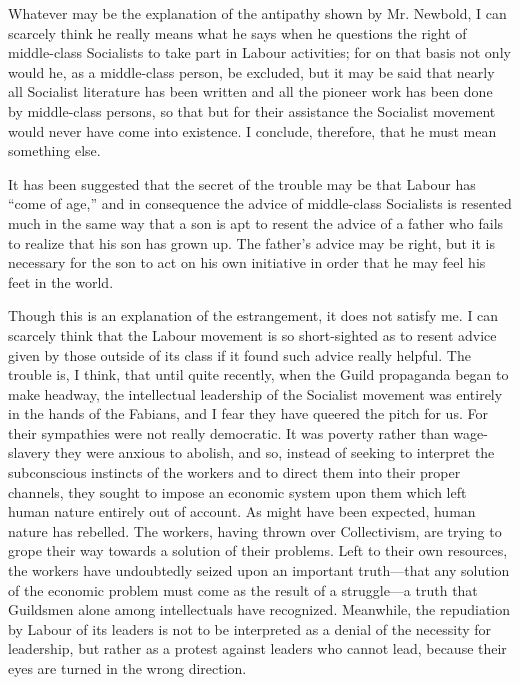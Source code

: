 \documentclass{book}
\begin{document}
Whatever may be the explanation of the antipathy shown by Mr. Newbold, I can scarcely think he really means what he says when he questions the right of middle-class Socialists to take part in Labour activities; for on that basis not only would he, as a middle-class person, be excluded, but it may be said that nearly all Socialist literature has been written and all the pioneer work has been done by middle-class persons, so that but for their assistance the Socialist movement would never have come into existence. I conclude, therefore, that he must mean something else.

It has been suggested that the secret of the trouble may be that Labour has “come of age,” and in consequence the advice of middle-class Socialists is resented much in the same way that a son is apt to resent the advice of a father who fails to realize that his son has grown up. The father’s advice may be right, but it is necessary for the son to act on his own initiative in order that he may feel his feet in the world.

Though this is an explanation of the estrangement, it does not satisfy me. I can scarcely think that the Labour movement is so short-sighted as to resent advice given by those outside of its class if it found such advice really helpful. The trouble is, I think, that until quite recently, when the Guild propaganda began to make headway, the intellectual leadership of the Socialist movement was entirely in the hands of the Fabians, and I fear they have queered the pitch for us. For their sympathies were not really democratic. It was poverty rather than wage-slavery they were anxious to abolish, and so, instead of seeking to interpret the subconscious instincts of the workers and to direct them into their proper channels, they sought to impose an economic system upon them which left human nature entirely out of account. As might have been expected, human nature has rebelled. The workers, having thrown over Collectivism, are trying to grope their way towards a solution of their problems. Left to their own resources, the workers have undoubtedly seized upon an important truth—that any solution of the economic problem must come as the result of a struggle—a truth that Guildsmen alone among intellectuals have recognized. Meanwhile, the repudiation by Labour of its leaders is not to be interpreted as a denial of the necessity for leadership, but rather as a protest against leaders who cannot lead, because their eyes are turned in the wrong direction.
\end{document}
